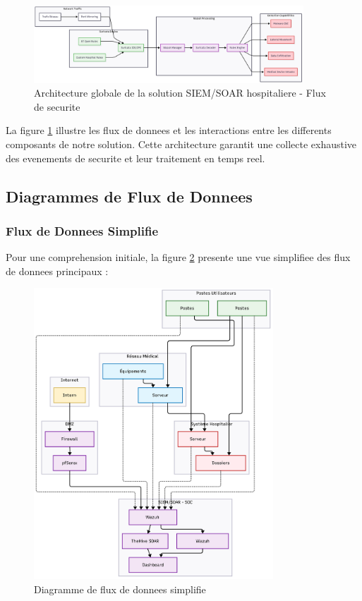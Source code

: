 \begin{figure}[H]
    \centering
    \includegraphics[width=0.9\textwidth]{images/network_security_flow.png}
    \caption{Architecture globale de la solution SIEM/SOAR hospitaliere - Flux de securite}
    \label{fig:architecture_globale}
\end{figure}

La figure \ref{fig:architecture_globale} illustre les flux de donnees et les interactions entre les differents composants de notre solution. Cette architecture garantit une collecte exhaustive des evenements de securite et leur traitement en temps reel.

\subsection{Diagrammes de Flux de Donnees}

\subsubsection{Flux de Donnees Simplifie}

Pour une comprehension initiale, la figure \ref{fig:flow_simple} presente une vue simplifiee des flux de donnees principaux :

\begin{figure}[H]
    \centering
    \includegraphics[width=0.8\textwidth]{images/flowData_simple.png}
    \caption{Diagramme de flux de donnees simplifie}
    \label{fig:flow_simple}
\end{figure}

